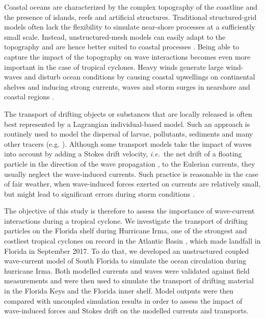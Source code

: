 \documentclass[preprint,12pt,authoryear]{elsarticle}
\newcommand{\ie}{{\it i.e.}\ }
\begin{document}
Coastal oceans are characterized by the complex topography of the coastline and the presence of islands, reefs and artificial structures. Traditional structured-grid models often lack the flexibility to simulate near-shore processes at a sufficiently small scale. Instead, unstructured-mesh models can easily adapt to the topography and are hence better suited to coastal processes \citep{wu2011fvcom, chen2007finite}. Being able to capture the impact of the topography on wave interactions becomes even more important in the case of tropical cyclones. Heavy winds generate large wind-waves and disturb ocean conditions \citep{liu2020impacts} by causing coastal upwellings on continental shelves \citep{smith1982response} and inducing strong currents, waves and storm surges in nearshore and coastal regions \citep{dietrich2010high, weisberg2006hurricane}. 

The transport of drifting objects or substances that are locally released is often best represented by a Lagrangian individual-based model. Such an approach is routinely used to model the dispersal of larvae, pollutants, sediments and many other tracers (e.g. \cite{le2012surface,liubartseva2018tracking, figueiredo2013synthesizing,frys2020fine}). Although some transport models take the impact of waves into account by adding a Stokes drift velocity, \ie the net drift of a floating particle in the direction of the wave propagation \citep{van2018stokes}, to the Eulerian currents, they usually neglect the wave-induced currents. Such practice is reasonable in the case of fair weather, when wave-induced forces exerted on currents are relatively small, but might lead to significant errors during storm conditions \citep{rohrs2012observation,curcic2016hurricane}. 

The objective of this study is therefore to assess the importance of wave-current interactions during a tropical cyclone. We investigate the transport of drifting particles on the Florida shelf during Hurricane Irma, one of the strongest and costliest tropical cyclones on record in the Atlantic Basin \citep{xian2018brief}, which made landfall in Florida in September 2017. To do that, we developed an unstructured coupled wave-current model of South Florida to simulate the ocean circulation during hurricane Irma. Both modelled currents and waves were validated against field measurements and were then used to simulate the transport of drifting material in the Florida Keys and the Florida inner shelf. Model outputs were then compared with uncoupled simulation results in order to assess the impact of wave-induced forces and Stokes drift on the modelled currents and transports.  
\end{document}
